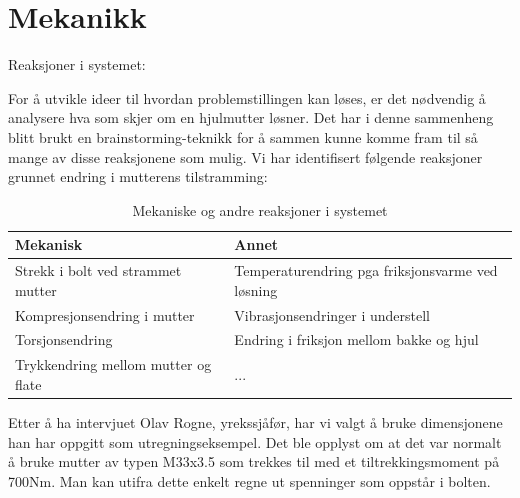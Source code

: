 	\section{Mekanikk}
Reaksjoner i systemet:

For å utvikle ideer til hvordan problemstillingen kan løses, er det nødvendig å analysere hva som skjer om en hjulmutter løsner. Det har i denne sammenheng blitt brukt en brainstorming-teknikk for å sammen kunne komme fram til så mange av disse reaksjonene som mulig. Vi har identifisert følgende reaksjoner grunnet endring i mutterens tilstramming:

\begin{table}[h]
\caption{Mekaniske og andre reaksjoner i systemet}
\begin{tabular}{|l|l|}
\hline
\textbf{Mekanisk}                   & \textbf{Annet}                                   \\
\hline
Strekk i bolt ved strammet mutter   & Temperaturendring pga friksjonsvarme ved løsning \\
\hline
Kompresjonsendring i mutter         & Vibrasjonsendringer i understell                 \\
\hline
Torsjonsendring                     & Endring i friksjon mellom bakke og hjul          \\
\hline
Trykkendring mellom mutter og flate & ...                                              \\
\hline
\end{tabular}
\end{table}

Etter å ha intervjuet Olav Rogne, yrekssjåfør, har vi valgt å bruke dimensjonene han har oppgitt som utregningseksempel. Det ble opplyst om at det var normalt å bruke mutter av typen M33x3.5 som trekkes til med et tiltrekkingsmoment på 700Nm. Man kan utifra dette enkelt regne ut spenninger som oppstår i bolten.

